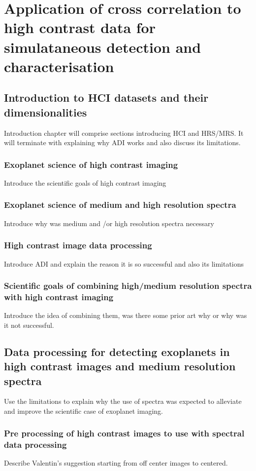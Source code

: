 \part{Application of cross correlation to high contrast data for simulataneous detection and characterisation}
\startcontents[chapters]
\printmyminitoc{
}



\chapter{Introduction to HCI datasets and their dimensionalities}
Introduction chapter will comprise sections introducing HCI and HRS/MRS. 
It will terminate with explaining why ADI works and also discuss its limitations.
\section{Exoplanet science of high contrast imaging}
Introduce the scientific goals of high contrast imaging
\section{Exoplanet science of medium and high resolution spectra }
Introduce why was medium and /or high resolution spectra necessary
\section{High contrast image data processing}
Introduce ADI and explain the reason it is so successful and also its limitations
\section{Scientific goals of combining high/medium resolution spectra with high contrast imaging}
Introduce the idea of combining them, was there some prior art why or why was it not successful.
\chapter{Data processing for detecting exoplanets in high contrast images and medium resolution spectra}
Use the limitations to explain why the use of spectra was expected to alleviate and improve the scientific case of exoplanet imaging. 
\section{Pre processing of high contrast images to use with spectral data processing}
Describe Valentin's suggestion starting from off center images to centered.
